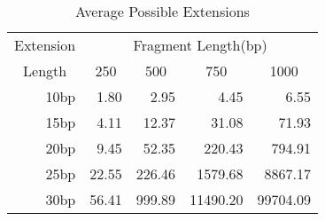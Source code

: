 \begin{table}[bth]
\caption{Average Possible Extensions}
\label{table3}
\begin{center}
\begin{tabular}{||r|rrrr||}  \hline
\multicolumn{1}{||c|}{Extension} & \multicolumn{4}{c||}{Fragment Length(bp)} \\ 
\multicolumn{1}{||c|}{Length} & \multicolumn{1}{c}{250} 
& \multicolumn{1}{c}{500} & \multicolumn{1}{c}{750}
& \multicolumn{1}{c||}{1000} \\ \hline
10bp &  1.80 &   2.95 &     4.45 &     6.55 \\
15bp &  4.11 &  12.37 &    31.08 &    71.93 \\
20bp &  9.45 &  52.35 &   220.43 &   794.91 \\
25bp & 22.55 & 226.46 &  1579.68 &  8867.17 \\
30bp & 56.41 & 999.89 & 11490.20 & 99704.09 \\ \hline
\end{tabular}
\end{center}
\end{table}
